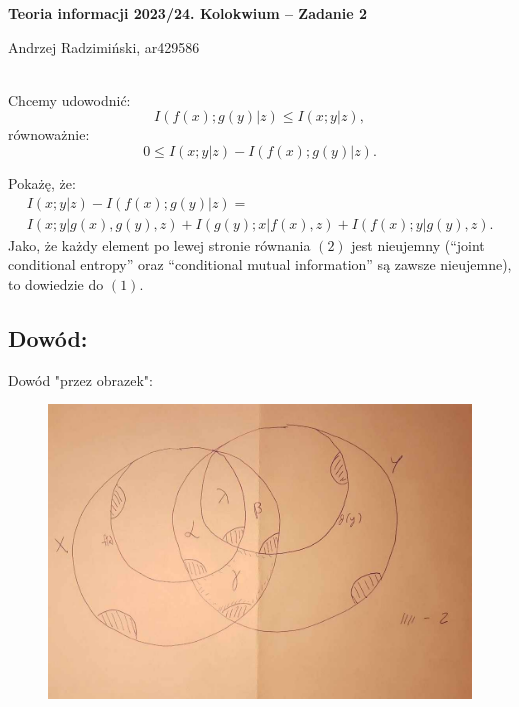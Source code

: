 



\setlength{\parindent}{0pt}
\noindent

{\bf Teoria informacji 2023/24. Kolokwium -- Zadanie 2}

Andrzej Radzimiński, ar429586
\\

\ \\

\newcommand{\ot}{\frac{1}{3}}
\newcommand{\twt}{\frac{2}{3}}

\renewcommand*{\arraystretch}{1.5}

Chcemy udowodnić:
\begin{equation}
	I(f(x) ; g(y) | z) \leq I(x ; y | z),
\end{equation}
równoważnie:
$$
	0 \leq I(x ; y | z) - I(f(x) ; g(y) | z).
$$

Pokażę, że:
\begin{multline}
	I(x ; y | z) - I(f(x) ; g(y) | z) = \\
	I(x ; y | g(x), g(y), z) +
	I(g(y) ; x | f(x), z) +
	I(f(x) ; y | g(y), z).
\end{multline}
Jako, że każdy element po lewej stronie równania $(2)$ jest nieujemny (``joint conditional entropy'' oraz ``conditional mutual information'' są zawsze nieujemne), to dowiedzie do $(1)$.

\subsection*{Dowód:}

Dowód "przez obrazek":

\begin{figure}[ht!]
	\centering
	\includegraphics[width=160mm]{obrazek.jpg}
\end{figure}

